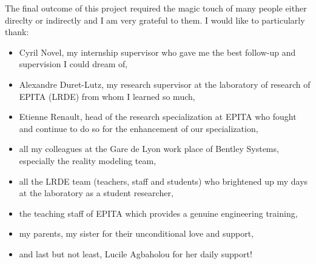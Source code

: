 \cleardoublepage


\begin{acknowledgements}

The final outcome of this project required the magic touch of many people either direclty or indirectly and I am very grateful to them.  I would like to particularly thank:
\begin{itemize}
\item Cyril Novel, my internship supervisor who gave me the best follow-up and supervision I could dream of,
\item Alexandre Duret-Lutz, my research supervisor at the laboratory of research of EPITA (LRDE) from whom I learned so much,
\item Etienne Renault, head of the research specialization at EPITA who fought and continue to do so for the enhancement of our specialization,
\item all my colleagues at the Gare de Lyon work place of Bentley Systems, especially the reality modeling team,
\item all the LRDE team (teachers, staff and students) who brightened up my days at the laboratory as a student researcher,
\item the teaching staff of EPITA which provides a genuine engineering training,
\item my parents, my sister for their unconditional love and support,
\item and last but not least, Lucile Agbaholou for her daily support!
\end{itemize}
\end{acknowledgements}